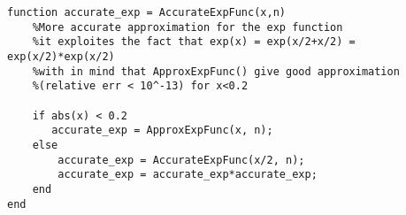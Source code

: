 \begin{lstlisting}
function accurate_exp = AccurateExpFunc(x,n)
    %More accurate approximation for the exp function
    %it exploites the fact that exp(x) = exp(x/2+x/2) = exp(x/2)*exp(x/2)
    %with in mind that ApproxExpFunc() give good approximation 
    %(relative err < 10^-13) for x<0.2
    
    if abs(x) < 0.2
       accurate_exp = ApproxExpFunc(x, n);
    else 
        accurate_exp = AccurateExpFunc(x/2, n);
        accurate_exp = accurate_exp*accurate_exp;
    end
end
\end{lstlisting}

